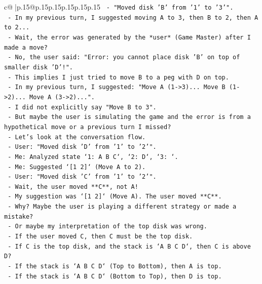 \documentclass{article}
\begin{document}
{\begin{supertabular}{c@{$\;$}|p{.15\linewidth}@{}p{.15\linewidth}p{.15\linewidth}p{.15\linewidth}p{.15\linewidth}p{.15\linewidth}}
{{{\texttt{            {-} "Moved disk 'B' from '1' to '3'".} \\
\texttt{            {-} In my previous turn, I suggested moving A to 3, then B to 2, then A to 2...} \\
\texttt{            {-} Wait, the error was generated by the *user* (Game Master) after I made a move?} \\
\texttt{            {-} No, the user said: "Error: you cannot place disk 'B' on top of smaller disk 'D'!".} \\
\texttt{            {-} This implies I just tried to move B to a peg with D on top.} \\
\texttt{            {-} In my previous turn, I suggested: "Move A (1{-}>3)... Move B (1{-}>2)... Move A (3{-}>2)...".} \\
\texttt{            {-} I did not explicitly say "Move B to 3".} \\
\texttt{            {-} But maybe the user is simulating the game and the error is from a hypothetical move or a previous turn I missed?} \\
\texttt{            {-} Let's look at the conversation flow.} \\
\texttt{            {-} User: "Moved disk 'D' from '1' to '2'".} \\
\texttt{            {-} Me: Analyzed state `1: A B C`, `2: D`, `3: `.} \\
\texttt{            {-} Me: Suggested `{[}1 2{]}` (Move A to 2).} \\
\texttt{            {-} User: "Moved disk 'C' from '1' to '2'".} \\
\texttt{            {-} Wait, the user moved **C**, not A!} \\
\texttt{            {-} My suggestion was `{[}1 2{]}` (Move A). The user moved **C**.} \\
\texttt{            {-} Why? Maybe the user is playing a different strategy or made a mistake?} \\
\texttt{            {-} Or maybe my interpretation of the top disk was wrong.} \\
\texttt{            {-} If the user moved C, then C must be the top disk.} \\
\texttt{            {-} If C is the top disk, and the stack is `A B C D`, then C is above D?} \\
\texttt{            {-} If the stack is `A B C D` (Top to Bottom), then A is top.} \\
\texttt{            {-} If the stack is `A B C D` (Bottom to Top), then D is top.} \\
}}}
\end{supertabular}}
\end{document}
